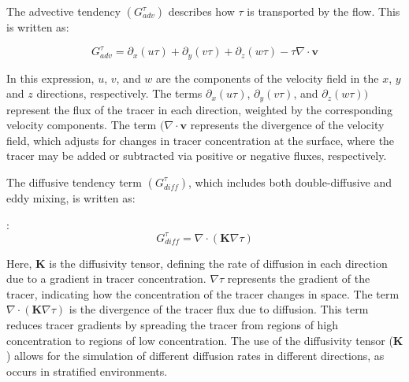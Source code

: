 \documentclass[draft]{agujournal2019}
\begin{document}
The advective tendency $(G^{\tau}_{adv})$ describes how $\tau$ is transported by the flow. This is written as:

$$
G^{\tau}_{{adv}} = \partial_x (u\tau) + \partial_y (v\tau) + \partial_z (w\tau) - \tau \nabla \cdot \mathbf{v}
$$

In this expression, $u$, $v$, and $w$ are the components of the velocity field in the $x$, $y$ and $z$ directions, respectively. The terms $\partial_x(u\tau)$, $\partial_y (v\tau)$, and $\partial_z (w\tau))$ represent the flux of the tracer in each direction, weighted by the corresponding velocity components. The term $(\nabla \cdot \mathbf{v}$ represents the divergence of the velocity field, which adjusts for changes in tracer concentration at the surface, where the tracer may be added or subtracted via positive or negative fluxes, respectively.

The diffusive tendency term $(G^{\tau}_{{diff}})$, which includes both double-diffusive and eddy mixing, is written as:

:
$$
G^{\tau}_{{diff}} = \nabla \cdot (\mathbf{K} \nabla \tau)
$$

Here, $\mathbf{K}$ is the diffusivity tensor, defining the rate of diffusion in each direction due to a gradient in tracer concentration. $\nabla \tau$ represents the gradient of the tracer, indicating how the concentration of the tracer changes in space. The term $\nabla \cdot (\mathbf{K} \nabla \tau)$ is the divergence of the tracer flux due to diffusion. This term reduces tracer gradients by spreading the tracer from regions of high concentration to regions of low concentration. The use of the diffusivity tensor (\(\mathbf{K}\)) allows for the simulation of different diffusion rates in different directions, as occurs in stratified environments.
\end{document}
